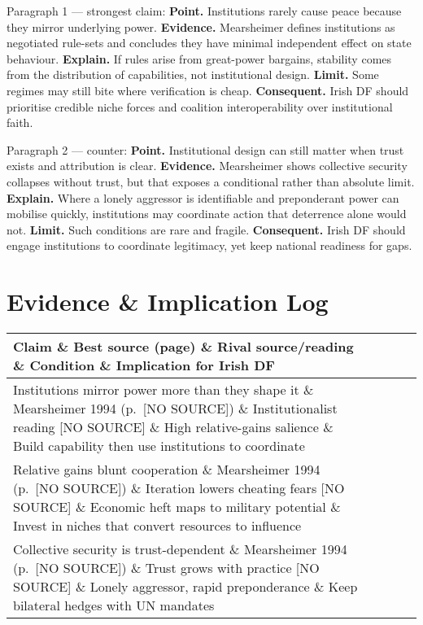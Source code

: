 Paragraph 1 — strongest claim:  
\textbf{Point.} Institutions rarely cause peace because they mirror underlying power.  
\textbf{Evidence.} Mearsheimer defines institutions as negotiated rule-sets and concludes they have minimal independent effect on state behaviour.  
\textbf{Explain.} If rules arise from great-power bargains, stability comes from the distribution of capabilities, not institutional design.  
\textbf{Limit.} Some regimes may still bite where verification is cheap.  
\textbf{Consequent.} Irish DF should prioritise credible niche forces and coalition interoperability over institutional faith.  

Paragraph 2 — counter:  
\textbf{Point.} Institutional design can still matter when trust exists and attribution is clear.  
\textbf{Evidence.} Mearsheimer shows collective security collapses without trust, but that exposes a conditional rather than absolute limit.  
\textbf{Explain.} Where a lonely aggressor is identifiable and preponderant power can mobilise quickly, institutions may coordinate action that deterrence alone would not.  
\textbf{Limit.} Such conditions are rare and fragile.  
\textbf{Consequent.} Irish DF should engage institutions to coordinate legitimacy, yet keep national readiness for gaps.  

\section*{Evidence \& Implication Log}  
\begin{tabular}{p{3.2cm}p{4.2cm}p{3.6cm}p{3.2cm}p{4.2cm}}  
	\textbf{Claim} \& \textbf{Best source (page)} \& \textbf{Rival source/reading} \& \textbf{Condition} \& \textbf{Implication for Irish DF}\\\hline  
	Institutions mirror power more than they shape it \& Mearsheimer 1994 (p.~[NO SOURCE]) \& Institutionalist reading [NO SOURCE] \& High relative-gains salience \& Build capability then use institutions to coordinate \\  
	Relative gains blunt cooperation \& Mearsheimer 1994 (p.~[NO SOURCE]) \& Iteration lowers cheating fears [NO SOURCE] \& Economic heft maps to military potential \& Invest in niches that convert resources to influence \\  
	Collective security is trust-dependent \& Mearsheimer 1994 (p.~[NO SOURCE]) \& Trust grows with practice [NO SOURCE] \& Lonely aggressor, rapid preponderance \& Keep bilateral hedges with UN mandates \\  
\end{tabular}  

